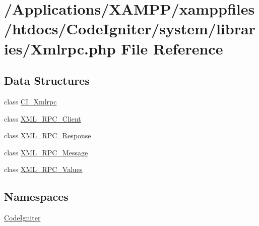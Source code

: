 \hypertarget{_xmlrpc_8php}{}\section{/\+Applications/\+X\+A\+M\+P\+P/xamppfiles/htdocs/\+Code\+Igniter/system/libraries/\+Xmlrpc.php File Reference}
\label{_xmlrpc_8php}
\subsection*{Data Structures}
\begin{DoxyCompactItemize}
\item 
class \mbox{\hyperlink{class_c_i___xmlrpc}{C\+I\+\_\+\+Xmlrpc}}
\item 
class \mbox{\hyperlink{class_x_m_l___r_p_c___client}{X\+M\+L\+\_\+\+R\+P\+C\+\_\+\+Client}}
\item 
class \mbox{\hyperlink{class_x_m_l___r_p_c___response}{X\+M\+L\+\_\+\+R\+P\+C\+\_\+\+Response}}
\item 
class \mbox{\hyperlink{class_x_m_l___r_p_c___message}{X\+M\+L\+\_\+\+R\+P\+C\+\_\+\+Message}}
\item 
class \mbox{\hyperlink{class_x_m_l___r_p_c___values}{X\+M\+L\+\_\+\+R\+P\+C\+\_\+\+Values}}
\end{DoxyCompactItemize}
\subsection*{Namespaces}
\begin{DoxyCompactItemize}
\item 
 \mbox{\hyperlink{namespace_code_igniter}{Code\+Igniter}}
\end{DoxyCompactItemize}
